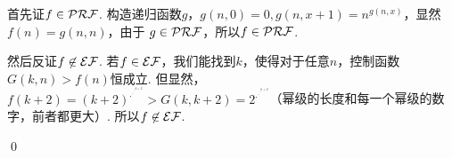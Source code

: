 \begin{pf} \rm 

首先证$f\in\mathcal{PRF}$. 
构造递归函数$g$，$g(n,0)=0, g(n, x+1)=n^{g(n,x)}$，显然$f(n)=g(n,n)$，由于 $g\in\mathcal{PRF}$，所以$f\in\mathcal{PRF}$.

然后反证$f\not\in\mathcal{EF}$. 若$f\in\mathcal{EF}$，我们能找到$k$，使得对于任意$n$，控制函数$G(k, n)>f(n)$恒成立. 但显然，$f(k+2) = {(k+2)}^{.^{.^{.^{k+2}}}} > G(k, k+2) = 2^{.^{.^{.^{k+2}}}}$（幂级的长度和每一个幂级的数字，前者都更大）. 所以$f\not\in\mathcal{EF}$.

\qed
\end{pf}
